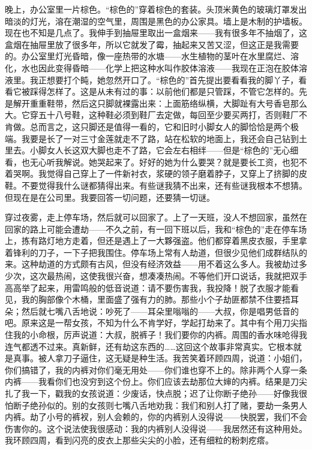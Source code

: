 晚上，办公室里一片棕色。“棕色的”穿着棕色的套装。头顶米黄色的玻璃灯罩发出暗淡的灯光，溶在潮湿的空气里，周围是黑色的办公家具。墙上是木制的护墙板。现在也不知是几点了。我伸手到抽屉里取出一盒烟来——我有很多年不抽烟了，这盒烟在抽屉里放了很多年，所以它就发了霉，抽起来又苦又涩，但这正是我需要的。办公室里灯光昏暗，像一座热带的水塘——水生植物的茎叶在水里腐烂、溶化，水也因此变得昏暗——化学上把这种水叫作胶体溶液——我现在正泡在胶体溶液里。我正想要打个盹，她忽然开口了。“棕色的”首先提出要看看我的脚丫子，看看它被踩得怎样了。这是从未有过的事：以前他们都是只管踩，不管它怎样的。先是解开重重鞋带，然后这只脚就裸露出来：上面筋络纵横，大脚趾有大号香皂那么大。它穿五十八号鞋，这种鞋必须到鞋厂去定做，每回至少要买两打，否则鞋厂不肯做。总而言之，这只脚还是值得一看的，它和旧时小脚女人的脚恰恰是两个极端。我要是长了一对三寸金莲就走不了路，站在松软的地面上，我还会自己钻到土里去。小脚女人长这双大脚也走不了路，它会左右相绊——但是“棕色的”无心细看，也无心听我解说。她哭起来了。好好的她为什么要哭？就是要长工资，也犯不着哭啊。我觉得自己穿上了一件新衬衣，浆硬的领子磨着脖子，又穿上了挤脚的皮鞋。不要觉得我什么谜都猜得出来。有些谜我猜不出来，还有些谜我根本不想猜。但现在是在公司里。我要回答一切问题，还要猜一切谜。 

穿过夜雾，走上停车场，然后就可以回家了。上了一天班，没人不想回家，虽然在回家的路上可能会遭劫——不久之前，有一回下班以后，我和“棕色的”走在停车场上，拣有路灯地方走着，但还是遇上了一大夥强盗。他们都穿着黑皮衣服，手里拿着锋利的刀子，一下子把我围住。停车场上常有人劫道，但很少见他们成群结队的来。这种劫道的方式颇有古风，但没有经济效益——用不着这么多人。我被劫过多少次，这次最热闹，这使我很兴奋，想凑凑热闹。不等他们开口说话，我就把双手高高举了起来，用雷鸣般的低音说道：请不要伤害我，我投降！脱了衣服才能看见，我的胸部像个木桶，里面盛了强有力的肺。那些小个子劫匪都禁不住要捂耳朵；然后就七嘴八舌地说：吵死了——耳朵里嗡嗡的——大叔，你是唱男低音的吧。原来这是一帮女孩，不知为什么不肯学好，学起打劫来了。其中有个用刀尖指住我的小命根，厉声说道：大叔，脱裤子！我们要你的内裤。周围的香水味呛得我连气都透不过来。真新鲜，还有劫这东西的……这回这个故事非常真实。它根本就是真事。被人拿刀子逼住，这无疑是种生活。我苦笑着环顾四周，说道：小姐们，你们搞错了，我的内裤对你们毫无用处——你们谁也穿不上的。除非两个人穿一条内裤——我看你们也没穷到这个份上。你们应该去劫那位大婶的内裤。结果是刀尖扎了我一下，戳我的女孩说道：少废话，快点脱；迟了让你断子绝孙——好像我很怕断子绝孙似的。别的女孩则七嘴八舌地劝我：我们和别人打了赌，要劫一条男人内裤。劫了小号的裤衩，别人会赖的，你的内裤别人没得说——快脱罢，我们不会伤害你的。这个说法使我很感动：我的内裤别人没得说——我居然还有这种用处。我环顾四周，看到闪亮的皮衣上那些尖尖的小脸，还有细粒的粉刺疙瘩。 

